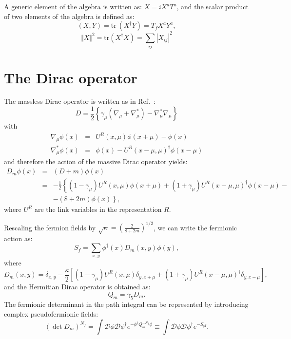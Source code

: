 \documentclass{article}[12pt]
\begin{document}
\noindent
A generic element of the algebra is written as: $X=i X^a T^a$, and the
scalar product of two elements of the algebra is defined as:
%
\begin{equation}
(X,Y)= \mathrm{tr\ } \left(X^\dagger Y\right) = T_f X^a Y^a,
\end{equation}
%
\begin{equation}
\Vert X \Vert^2 = \mathrm{tr } \left(X^\dagger X\right)
 = \sum_{ij} \left| X_{ij} \right|^2
\end{equation}

\section{The Dirac operator}
The massless Dirac operator is written as in Ref.~\cite{Luscher:1996sc}:
%
\begin{equation}
D = \frac12 \left\{\gamma_\mu \left(\nabla_\mu + \nabla^*_\mu \right)
- \nabla^*_\mu \nabla_\mu \right\}
\end{equation}
%
with
%
\begin{eqnarray}
\nabla_\mu\phi(x) &=& U^R (x,\mu)\phi(x+\mu) - \phi(x) \\
\nabla_\mu^*\phi(x) &=& \phi(x) - U^R (x-\mu,\mu)^\dagger\phi(x-\mu)
\end{eqnarray}
%
and therefore the action of the massive Dirac operator yields:
%
\begin{eqnarray}
D_m \phi(x) &=& (D+m) \phi(x) \nonumber \\
&=& - \frac12 \left\{ \left(1-\gamma_\mu\right) U^R(x,\mu) \phi(x+\mu) +
\left(1+\gamma_\mu\right) U^R(x-\mu,\mu)^\dagger \phi(x-\mu) - \right.
\nonumber \\
& & \left. -(8+2m) \phi(x) \right\}, \label{DM}
\end{eqnarray}
%
where $U^R$ are the link variables in the representation $R$.

Rescaling the fermion fields by
$\sqrt{\kappa}=\left(\frac{2}{8+2m}\right)^{1/2}$, we can write the
fermionic action as:
%
\begin{equation}
S_f = \sum_{x,y} \phi^\dagger(x) D_m(x,y) \phi(y),
\end{equation}
%
where
%
\begin{equation}
D_m(x,y) = \delta_{x,y} - \frac{\kappa}{2}
\left[(1-\gamma_\mu) U^R(x,\mu) \delta_{y,x+\mu} +
(1+\gamma_\mu) U^R(x-\mu,\mu)^\dagger \delta_{y,x-\mu} \right],
\end{equation}
%
and the Hermitian Dirac operator is obtained as:
%
\begin{equation}
Q_m = \gamma_5 D_m. \label{QM}
\end{equation}
The fermionic determinant in the path integral can be represented by
introducing complex pseudofermionic fields:
\begin{equation}
\left(\det D_m\right)^{N_f} =
\int \mathcal D \phi \mathcal D \phi^\dagger e^{-\phi^\dagger
  Q_m^{-N_f} \phi} \equiv
\int \mathcal D \phi \mathcal D \phi^\dagger e^{-S_\mathrm{pf}}.
\end{equation}
\end{document}
